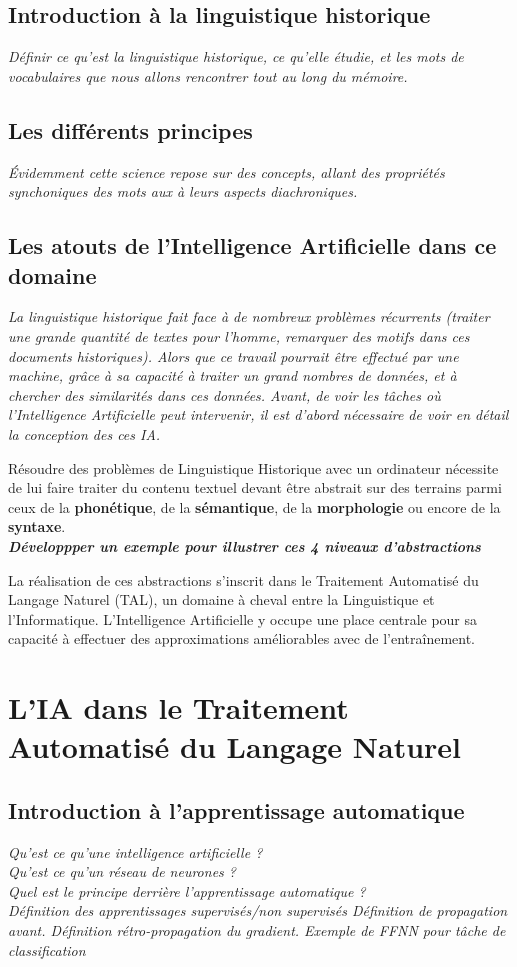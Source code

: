 \documentclass[12pt, french]{report}
\begin{document}
\subsection{Introduction à la linguistique historique}
\textit{Définir ce qu'est la linguistique historique, ce qu'elle étudie, et les mots de vocabulaires que nous allons rencontrer tout au long du mémoire.}
\subsection{Les différents principes}
\textit{Évidemment cette science repose sur des concepts, allant des propriétés synchoniques des mots aux à leurs aspects diachroniques.}
\subsection{Les atouts de l'Intelligence Artificielle dans ce domaine}
\textit{La linguistique historique fait face à de nombreux problèmes récurrents (traiter une grande quantité de textes pour l'homme, remarquer des motifs dans ces documents historiques). Alors que ce travail pourrait être effectué par une machine, grâce à sa capacité à traiter un grand nombres de données, et à chercher des similarités dans ces données. Avant, de voir les tâches où l'Intelligence Artificielle peut intervenir, il est d'abord nécessaire de voir en détail la conception des ces IA.}

Résoudre des problèmes de Linguistique Historique avec un ordinateur nécessite de lui faire traiter
du contenu textuel devant être abstrait sur des terrains parmi ceux de la \textbf{phonétique}, de la
\textbf{sémantique}, de la \textbf{morphologie} ou encore de la \textbf{syntaxe}.\\
\textbf{\textit{Développper un exemple pour illustrer ces 4 niveaux d'abstractions}}

La réalisation de ces abstractions s'inscrit dans le Traitement Automatisé du Langage Naturel (TAL),
un domaine à cheval entre la Linguistique et l'Informatique. L'Intelligence Artificielle y occupe
une place centrale pour sa capacité à effectuer des approximations améliorables avec de l'entraînement.


\section{L'IA dans le Traitement Automatisé du Langage Naturel}
\subsection{Introduction à l'apprentissage automatique}
\textit{Qu'est ce qu'une intelligence artificielle ?\\
    Qu'est ce qu'un réseau de neurones ?\\
    Quel est le principe derrière l'apprentissage automatique ?\\
    Définition des apprentissages supervisés/non supervisés
    Définition de propagation avant.
    Définition rétro-propagation du gradient.
    Exemple de FFNN pour tâche de classification}
\end{document}
